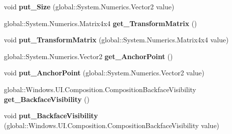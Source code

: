 \begin{DoxyCompactItemize}
\item 
\mbox{\label{interface_windows_1_1_u_i_1_1_composition_1_1_i_visual_a40381fd8b9d0a94c741b895b7e107cc7}} 
void {\bfseries put\+\_\+\+Size} (global\+::\+System.\+Numerics.\+Vector2 value)
\item 
\mbox{\label{interface_windows_1_1_u_i_1_1_composition_1_1_i_visual_ab7a1f90666dae73a006fb9ff5e2943fc}} 
global\+::\+System.\+Numerics.\+Matrix4x4 {\bfseries get\+\_\+\+Transform\+Matrix} ()
\item 
\mbox{\label{interface_windows_1_1_u_i_1_1_composition_1_1_i_visual_a74c1e3422a186d04eb48fb2921e293e4}} 
void {\bfseries put\+\_\+\+Transform\+Matrix} (global\+::\+System.\+Numerics.\+Matrix4x4 value)
\item 
\mbox{\label{interface_windows_1_1_u_i_1_1_composition_1_1_i_visual_a5954807f57ab0fb2f59d4ab8f73a2faa}} 
global\+::\+System.\+Numerics.\+Vector2 {\bfseries get\+\_\+\+Anchor\+Point} ()
\item 
\mbox{\label{interface_windows_1_1_u_i_1_1_composition_1_1_i_visual_a2a44f2ada8b97071f0b6b3139bf1aaae}} 
void {\bfseries put\+\_\+\+Anchor\+Point} (global\+::\+System.\+Numerics.\+Vector2 value)
\item 
\mbox{\label{interface_windows_1_1_u_i_1_1_composition_1_1_i_visual_a83e38e1d6e7fc6654c6e612d6e9314dd}} 
global\+::\+Windows.\+U\+I.\+Composition.\+Composition\+Backface\+Visibility {\bfseries get\+\_\+\+Backface\+Visibility} ()
\item 
\mbox{\label{interface_windows_1_1_u_i_1_1_composition_1_1_i_visual_a22c2fbf95af53308d61ed61707e52a15}} 
void {\bfseries put\+\_\+\+Backface\+Visibility} (global\+::\+Windows.\+U\+I.\+Composition.\+Composition\+Backface\+Visibility value)
\item 
\mbox{\label{interface_windows_1_1_u_i_1_1_composition_1_1_i_visual_ad857db42be0a85e8710144f9a8a0b412}} 

\end{DoxyCompactItemize}
